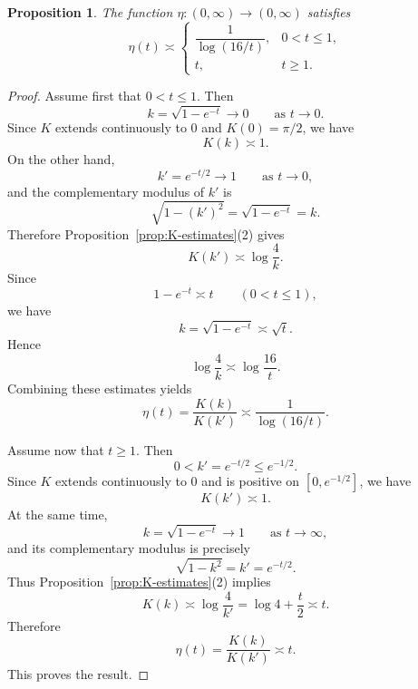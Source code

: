 \documentclass[10pt,a4paper]{amsart}
\newtheorem{proposition}{Proposition}
\begin{document}
\begin{proposition}
\label{prop:eta-regimes}
The function $\eta:(0,\infty)\to(0,\infty)$ satisfies
\[
\eta(t)\asymp
\begin{cases}
\dfrac{1}{\log(16/t)}, & 0<t\le 1,\\[1.2ex]
t, & t\ge 1.
\end{cases}
\]
\end{proposition}

\begin{proof}
Assume first that $0<t\le 1$. Then
\[
k=\sqrt{1-e^{-t}}\to 0
\qquad\text{as }t\to0.
\]
Since $K$ extends continuously to $0$ and $K(0)=\pi/2$, we have
\[
K(k)\asymp 1.
\]
On the other hand,
\[
k'=e^{-t/2}\to 1
\qquad\text{as }t\to 0,
\]
and the complementary modulus of $k'$ is
\[
\sqrt{1-(k')^2}=\sqrt{1-e^{-t}}=k.
\]
Therefore Proposition~\ref{prop:K-estimates}(2) gives
\[
K(k')\asymp \log\frac{4}{k}.
\]
Since
\[
1-e^{-t}\asymp t
\qquad (0<t\le 1),
\]
we have
\[
k=\sqrt{1-e^{-t}}\asymp \sqrt t.
\]
Hence
\[
\log\frac{4}{k}\asymp \log\frac{16}{t}.
\]
Combining these estimates yields
\[
\eta(t)=\frac{K(k)}{K(k')}
\asymp \frac{1}{\log(16/t)}.
\]

Assume now that $t\ge 1$. Then
\[
0<k'=e^{-t/2}\le e^{-1/2}.
\]
Since $K$ extends continuously to $0$ and is positive on
$[0,e^{-1/2}]$, we have
\[
K(k')\asymp 1.
\]
At the same time,
\[
k=\sqrt{1-e^{-t}}\to 1
\qquad\text{as }t\to\infty,
\]
and its complementary modulus is precisely
\[
\sqrt{1-k^2}=k'=e^{-t/2}.
\]
Thus Proposition~\ref{prop:K-estimates}(2) implies
\[
K(k)\asymp \log\frac{4}{k'}
=\log 4+\frac t2
\asymp t.
\]
Therefore
\[
\eta(t)=\frac{K(k)}{K(k')}
\asymp t.
\]
This proves the result.
\end{proof}
\end{document}
